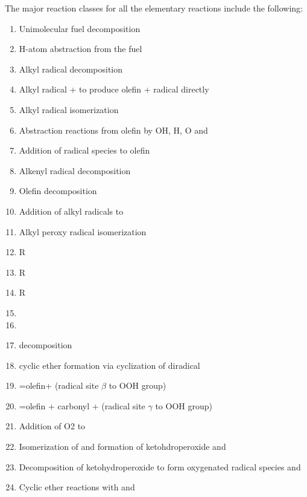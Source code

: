 The major reaction classes for all the elementary reactions include the following:
\begin{enumerate}
    \item Unimolecular fuel decomposition
    \item H-atom abstraction from the fuel
    \item Alkyl radical decomposition
    \item Alkyl radical +  to produce olefin +  radical directly
    \item Alkyl radical isomerization
    \item Abstraction reactions from olefin by OH, H, O and 
    \item Addition of radical species to olefin 
    \item Alkenyl radical decomposition
    \item Olefin decomposition 
    \item Addition of alkyl radicals to  
    \item Alkyl peroxy radical isomerization 
    \item R
    \item R
    \item R
    \item {}
    \item {}
    \item {} decomposition
    \item {} cyclic ether formation via cyclization of diradical
    \item {}=olefin+ (radical site $\beta$ to OOH group)
    \item {}=olefin + carbonyl +  (radical site $\gamma$ to OOH group)
    \item Addition of O2 to 
    \item Isomerization of  and formation of ketohdroperoxide and 
    \item Decomposition of ketohydroperoxide to form oxygenated radical species and 
    \item Cyclic ether reactions with  and 
\end{enumerate}
 
